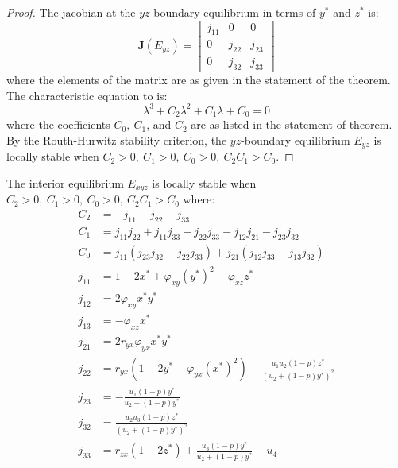 \begin{proof}
    The jacobian at the $yz$-boundary equilibrium in terms of $y^*$ and $z^*$ is:
    \begin{equation}\label{matrix:jacobian-boundary-yz}
        \textbf{J}\left(E_{yz}\right) = \begin{bmatrix}
            j_{11} & 0 & 0\\
            0 & j_{22} & j_{23}\\
            0 & j_{32} & j_{33}
        \end{bmatrix}
    \end{equation}
    where the elements of the matrix are as given in the statement of the theorem.
    The characteristic equation to  is:
    \begin{equation*}\label{eq:char-eq-yz}
        \lambda^3+C_2\lambda^2+C_1\lambda+C_0=0
    \end{equation*}
    where the coefficients $C_0,\ C_1$, and $C_2$ are as listed in the statement of theorem.
    By the Routh-Hurwitz stability criterion, the $yz$-boundary equilibrium $E_{yz}$ is locally stable when $C_2>0,\ C_1>0,\ C_0>0,\ C_2C_1>C_0$.
\end{proof}
\begin{theorem}\label{thm:interior-stability}
    The interior equilibrium $E_{xyz}$ is locally stable when $C_2>0,\ C_1>0,\ C_0>0,\ C_2C_1>C_0$ where:
    \begin{align*}
        C_2 &= -j_{11}-j_{22}-j_{33}\\
        C_1 &= j_{11}j_{22}+j_{11}j_{33}+j_{22}j_{33}-j_{12}j_{21}-j_{23}j_{32}\\
        C_0 &= j_{11}\left(j_{23}j_{32}-j_{22}j_{33}\right)+j_{21}\left(j_{12}j_{33}-j_{13}j_{32}\right)\\
        j_{11} &= 1-2x^*+\varphi_{xy}\left(y^*\right)^2-\varphi_{xz}z^*\\
        j_{12} &= 2\varphi_{xy}x^*y^*\\
        j_{13} &= -\varphi_{xz}x^*\\
        j_{21} &= 2r_{yx}\varphi_{yx}x^*y^*\\
        j_{22} &= r_{yx}\left(1-2y^*+\varphi_{yx}\left(x^*\right)^2\right)-\frac{u_1u_2\left(1-p\right)z^*}{\left(u_2+\left(1-p\right)y^*\right)^2}\\
        j_{23} &= -\frac{u_1\left(1-p\right)y^*}{u_2+\left(1-p\right)y^*}\\
        j_{32} &= \frac{u_2u_3\left(1-p\right)z^*}{\left(u_2+\left(1-p\right)y^*\right)^2}\\
        j_{33} &= r_{zx}\left(1-2z^*\right)+\frac{u_3\left(1-p\right)y^*}{u_2+\left(1-p\right)y^*}-u_4
    \end{align*}
\end{theorem}
